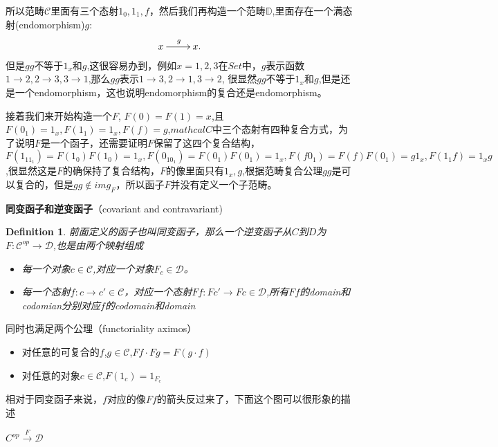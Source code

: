 \documentclass[UTF8,11pt,a4paper]{ctexart}
\newtheorem{definition}[theorem]{Definition}
\begin{document}
所以范畴$\mathcal{C}$里面有三个态射$1_0,1_1,f$，然后我们再构造一个范畴$\mathbb{D}$,里面存在一个满态射(endomorphism)$g$:
\[\xymatrix{x\ar[r]^g&x.}\]
但是$gg$不等于$1_x$和$g$,这很容易办到，例如$x={1,2,3}$在$Set$中，$g$表示函数$1 \rightarrow 2, 2\rightarrow 3 ,3 \rightarrow 1$,那么$gg$表示$1 \rightarrow 3, 2 \rightarrow 1 , 3 \rightarrow 2$, 很显然$gg$不等于$1_x$和$g$,但是还是一个endomorphism，这也说明endomorphism的复合还是endomorphism。

接着我们来开始构造一个$F$, $F(0)=F(1)=x$,且$F(0_1)=1_x,F(1_1)=1_x,F(f)=g$,$mathcal{C}$中三个态射有四种复合方式，为了说明$F$是一个函子，还需要证明$F$保留了这四个复合结构，$F(1_11_1)=F(1_0)F(1_0)=1_x,F(0_10_1)=F(0_1)F(0_1)=1_x,F(f0_1)=F(f)F(0_1)=g1_x,F(1_1f)=1_xg$,很显然这是$F$的确保持了复合结构，$F$的像里面只有$1_x,g$,根据范畴复合公理$gg$是可以复合的，但是$gg \notin img_F$，所以函子$F$并没有定义一个子范畴。


\begin{flushleft}
\textbf{同变函子和逆变函子}（covariant and contravariant)
\end{flushleft}

\begin{definition}
前面定义的函子也叫同变函子，那么一个逆变函子从$C$到$D$为$F: \mathcal{C}^{op} \rightarrow \mathcal{D} $,也是由两个映射组成
\begin{itemize}
	\item 每一个对象$c \in \mathcal{C}$,对应一个对象$F_c \in \mathcal{D}$。
	\item 每一个态射$f \colon c \rightarrow	c' \in \mathcal{C}$，对应一个态射$Ff \colon Fc' \rightarrow Fc \in \mathcal{D}$,所有$Ff$的domain和codomian分别对应$f$的codomain和domain
\end{itemize}
\end{definition}
同时也满足两个公理（functoriality aximos）\\
\begin{itemize}
	\item 对任意的可复合的$f$,$g \in \mathcal{C}$,$Ff \cdot Fg = F(g \cdot f)$
	\item 对任意的对象$c \in \mathcal{C}$,$F(1_c)=1_{F_c}$
\end{itemize}
相对于同变函子来说，$f$对应的像$Ff$的箭头反过来了，下面这个图可以很形象的描述

\begin{center}
$C^{op} \xrightarrow{F} \mathcal{D}$ \\
\end{center}	
\end{document}
